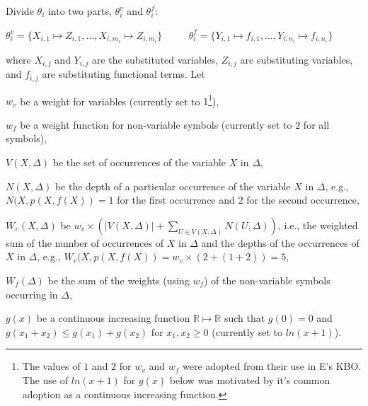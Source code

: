 \documentclass[EPiC]{easychair}
\newenvironment{packed_itemize}{
\vspace*{-0.5em}
\begin{itemize}
  \setlength{\partopsep}{0pt}
  \setlength{\itemsep}{1pt}
  \setlength{\parskip}{0pt}
  \setlength{\parsep}{0pt}
}{\end{itemize}}
\begin{document}
Divide $\theta_i$ into two parts, $\theta_i^v$ and $\theta_i^f$:
\begin{center}
$\theta_i^v=\{X_{i,1}\mapsto Z_{i,1},\dots,X_{i,m_i}\mapsto Z_{i,m_i}\}$
~~~~
$\theta_i^f=\{Y_{i,1}\mapsto f_{i,1},\dots,Y_{i,n_i}\mapsto f_{i,n_i}\}$
\end{center}
where $X_{i,j}$ and $Y_{i,j}$ are the substituted variables, 
$Z_{i,j}$ are substituting variables, and
$f_{i,j}$ are substituting functional terms.
Let
\begin{packed_itemize}
\item $w_v$ be a weight for variables (currently set to $1$\footnote{%
The values of $1$ and $2$ for $w_v$ and $w_f$ were adopted from their use 
in E's KBO.
The use of $ln(x+1)$ for $g(x)$ below was motivated by it's common
adoption as a continuous increasing function.}),
\item $w_f$ be a weight function for non-variable symbols (currently
      set to $2$ for all symbols),
\item $V(X,\Delta)$ be the set of occurrences of the variable $X$ in $\Delta$,
\item $N(X,\Delta)$ be the depth of a particular occurrence of the 
      variable $X$ in $\Delta$, e.g., $N(X,p(X,f(X)) = 1$ for the first 
      occurrence and $2$ for the second occurrence,
\item $W_v(X,\Delta)$ be 
      $w_v \times (|V(X,\Delta)| + \sum_{U \in V(X,\Delta)} N(U,\Delta))$,
      i.e., the weighted sum of the number of occurrences of $X$ in $\Delta$ 
      and the depths of the occurrences of $X$ in $\Delta$, e.g., 
      $W_v(X,p(X,f(X)) = w_v \times (2 + (1+2)) = 5$,
\item $W_f(\Delta)$ be the sum of the weights (using $w_f$) of the 
      non-variable symbols occurring in $\Delta$,
\item $g(x)$ be a continuous increasing function 
      $\mathbb{R} \mapsto \mathbb{R}$ such that 
      $g(0)=0$
      and
      $g(x_1+x_2) \leq g(x_1)+ g(x_2)$ for $x_1, x_2\geq0$
      (currently set to $ln(x+1)$).
\end{packed_itemize}
\end{document}
